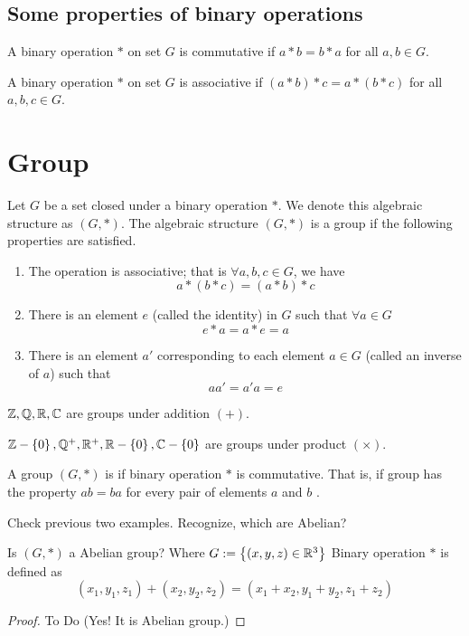 \subsection{Some properties of binary operations}
\begin{defn}
A binary operation $*$ on set $G$ is commutative if $a*b = b*a$ for all $a,b\in
G$.
\end{defn}
\begin{defn}
A binary operation $*$ on set $G$ is associative if $(a*b)*c = a*(b*c)$ for all $a,b, c\in G$.
\end{defn}
\section{Group}
\begin{defn}
Let $G$  be a set closed under a binary operation $*$. We denote this  algebraic
structure as $(G,*)$. The algebraic structure $(G,*)$ is a group if the following
properties are satisfied.
\begin{enumerate}
\item The operation is associative; that is $\forall a,b,c \in G$, we have
\[a*(b*c) =(a*b)*c\]
\item There is an element $e$ (called the identity) in $G$ such that $\forall
a\in G$
\[e*a = a*e=a\]
\item  There is an element $a'$ corresponding to each element $a\in G$ (called
an inverse of $a$) such that \[aa' = a'a = e\]
\end{enumerate}
\end{defn}

\begin{ex}
	$\mathbb Z, \mathbb Q, \mathbb R, \mathbb C$ are groups under addition $(+)$.
\end{ex}

\begin{ex}
	$\mathbb Z-\left\{0\right\}, \mathbb Q^+, \mathbb R^+, \mathbb R-\left\{0\right\}, \mathbb C-\left\{0\right\}$ are groups under product $(\times)$.
\end{ex}

\begin{defn}
A group $(G,*)$ is  if binary operation $*$ is commutative.
That is, if group has the property $ab=ba$ for every pair of elements $a$
and $b$
.\end{defn}

\begin{xca}
Check previous two examples. Recognize, which are Abelian?
\end{xca}

\begin{ex}
	Is $(G,*)$ a Abelian group? Where $G:=\left\{(x,y,z)\in \mathbb R^3\right\}$ Binary operation $*$ is defined as 
	\[(x_1,y_1,z_1) + (x_2,y_2,z_2) = (x_1+x_2,y_1+y_2,z_1+z_2)\]
\end{ex}
\begin{proof}
To Do (Yes! It is Abelian group.)	
\end{proof}

